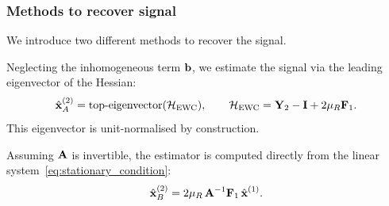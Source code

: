 \documentclass[11pt]{article}
\begin{document}
\subsubsection{Methods to recover signal}
We introduce two different methods to recover the signal.

\begin{defn}
Neglecting the inhomogeneous term $\boldsymbol{\mathbf{b}}$, we estimate the signal via
the leading eigenvector of the Hessian:
\[
    \hat{\boldsymbol{\mathbf{x}}}^{(2)}_A
    = \operatorname{top-eigenvector}(\mathcal{H}_{\mathrm{EWC}}),
    \qquad
    \mathcal{H}_{\mathrm{EWC}}
    = \boldsymbol{\mathbf{Y}}_2 - \boldsymbol{\mathbf{I}} + 2\mu_R\boldsymbol{\mathbf{F}}_1.
\]
This eigenvector is unit-normalised by construction.
\end{defn}


\begin{defn}
Assuming $\boldsymbol{\mathbf{A}}$ is invertible, the estimator is computed directly from
the linear system~\eqref{eq:stationary_condition}:
\[
    \hat{\boldsymbol{\mathbf{x}}}^{(2)}_B
    = 2\mu_R\,\boldsymbol{\mathbf{A}}^{-1}\boldsymbol{\mathbf{F}}_1\,\hat{\boldsymbol{\mathbf{x}}}^{(1)}.
\]
\end{defn}
\end{document}
